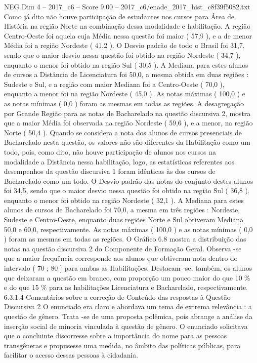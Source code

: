 \begin{textsample}{NEG Dim 4 – 2017\_c6 – Score 9.00 – 2017\_c6/enade\_2017\_hist\_c8f39f5082.txt}
Como já dito não houve participação de estudantes nos cursos para Área de História na região Norte na combinação dessa modalidade e habilitação.
A região Centro-Oeste foi aquela cuja Média nessa questão foi maior ( 57,9 ), e a de menor Média foi a região Nordeste ( 41,2 ).
O Desvio padrão de todo o Brasil foi 31,7, sendo que o maior desvio nessa questão foi obtido na região Nordeste ( 34,7 ), enquanto o menor foi obtido na região Sul ( 30,5 ).
A Mediana para estes alunos de cursos a Distância de Licenciatura foi 50,0, a mesma obtida em duas regiões : Sudeste e Sul, e a região com maior Mediana foi a Centro-Oeste ( 70,0 ), enquanto a menor foi na região Nordeste ( 45,0 ).
As notas máximas ( 100,0 ) e as notas mínimas ( 0,0 ) foram as mesmas em todas as regiões.
A desagregação por Grande Região para as notas de Bacharelado na questão discursiva 2, mostra que a maior Média foi observada na região Nordeste ( 59,6 ), e a menor, na região Norte ( 50,4 ).
Quando se considera a nota dos alunos de cursos presenciais de Bacharelado nesta questão, os valores não são diferentes da Habilitação como um todo, pois, como dito, não houve participação de alunos nos cursos na modalidade a Distância nessa habilitação, logo, as estatísticas referentes aos desempenhos da questão discursiva 1 foram idênticas às dos cursos de Bacharelado como um todo.
O Desvio padrão das notas do conjunto destes alunos foi 34,5, sendo que o maior desvio nessa questão foi obtido na região Sul ( 36,8 ), enquanto o menor foi obtido na região Nordeste ( 32,1 ).
A Mediana para estes alunos de cursos de Bacharelado foi 70,0, a mesma em três regiões : Nordeste, Sudeste e Centro-Oeste, enquanto duas regiões Norte e Sul obtiveram Mediana 50,0 e 60,0, respectivamente.
As notas máximas ( 100,0 ) e as notas mínimas ( 0,0 ) foram as mesmas em todas as regiões.
O Gráfico 6.8 mostra a distribuição das notas na questão discursiva 2 do Componente de Formação Geral.
Observa -se que a maior frequência corresponde aos alunos que obtiveram nota dentro do intervalo ( 70 ; 80 ] para ambas as Habilitações.
Destacam -se, também, os alunos que deixaram a questão em branco, com proporção um pouco maior do que 10 \% e do que 15 \% para as habilitações Licenciatura e Bacharelado, respectivamente. 6.3.1.4 Comentários sobre a correção de Conteúdo das respostas à Questão Discursiva 2 O enunciado era claro e abordava um tema de extrema relevância : a questão de gênero.
Trata -se de uma proposta polêmica, pois abrange a análise da inserção social de minoria vinculada à questão de gênero.
O enunciado solicitava que o concluinte discorresse sobre a importância do nome para as pessoas transgêneras e propusesse uma medida, no âmbito das políticas públicas, para facilitar o acesso dessas pessoas à cidadania.

\end{textsample}
